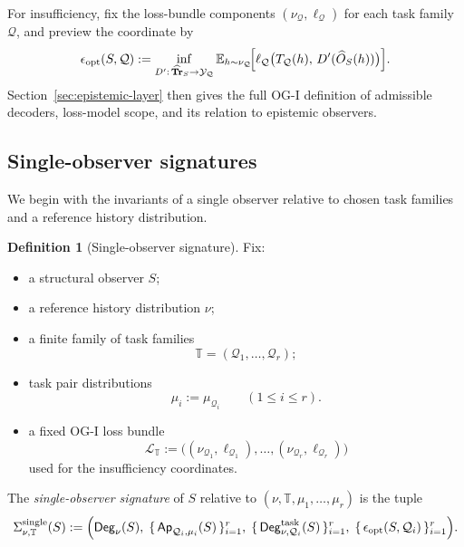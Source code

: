 \documentclass[11pt,twoside]{article}
\theoremstyle{definition}
\newtheorem{definition}[theorem]{Definition}
\newcommand{\Tr}{\mathbf{Tr}}
\newcommand{\task}{\mathrm{task}}
\newcommand{\TaskBundle}{\mathbb{T}}
\begin{document}
For insufficiency, fix the loss-bundle components \((\nu_{\mathcal{Q}},\ell_{\mathcal{Q}})\) for each task family \(\mathcal{Q}\), and preview the coordinate by
\[
  \epsilon_{\mathrm{opt}}(S,\mathcal{Q})
  :=
  \inf_{D':\,\widehat{\Tr}_S\to\mathcal{Y}_{\mathcal{Q}}}
  \mathbb{E}_{h\sim \nu_{\mathcal{Q}}}
  \!\Bigl[
    \ell_{\mathcal{Q}}
    \bigl(
      T_{\mathcal{Q}}(h),\,
      D'(\widehat{O}_S(h))
    \bigr)
  \Bigr].
\]
Section~\ref{sec:epistemic-layer} then gives the full OG-I definition of admissible decoders, loss-model scope, and its relation to epistemic observers.

\subsection{Single-observer signatures}
\label{subsec:single-observer-signatures}

We begin with the invariants of a single observer relative to chosen task families and a reference history distribution.

\begin{definition}[Single-observer signature]
\label{def:single-observer-signature}
Fix:
\begin{itemize}[leftmargin=*]
  \item a structural observer \(S\);
  \item a reference history distribution \(\nu\);
  \item a finite family of task families
        \[
          \TaskBundle = (\mathcal{Q}_1,\ldots,\mathcal{Q}_r);
        \]
  \item task pair distributions
        \[
          \mu_i := \mu_{\mathcal{Q}_i}
          \qquad (1\le i\le r).
        \]
  \item a fixed OG-I loss bundle
        \[
          \mathcal{L}_{\TaskBundle}
          :=
          \bigl((\nu_{\mathcal{Q}_1},\ell_{\mathcal{Q}_1}),\ldots,(\nu_{\mathcal{Q}_r},\ell_{\mathcal{Q}_r})\bigr)
        \]
        used for the insufficiency coordinates.
\end{itemize}
The \emph{single-observer signature} of \(S\) relative to \((\nu,\TaskBundle,\mu_1,\ldots,\mu_r)\) is the tuple
\[
  \Sigma^{\mathrm{single}}_{\nu,\TaskBundle}(S)
  :=
  \Bigl(
    \mathsf{Deg}_\nu(S),\;
    \{\,\mathsf{Ap}_{\mathcal{Q}_i,\mu_i}(S)\,\}_{i=1}^{r},\;
    \{\,\mathsf{Deg}^{\task}_{\nu,\mathcal{Q}_i}(S)\,\}_{i=1}^{r},\;
    \{\,\epsilon_{\mathrm{opt}}(S,\mathcal{Q}_i)\,\}_{i=1}^{r}
  \Bigr).
\]
\end{definition}
\end{document}

